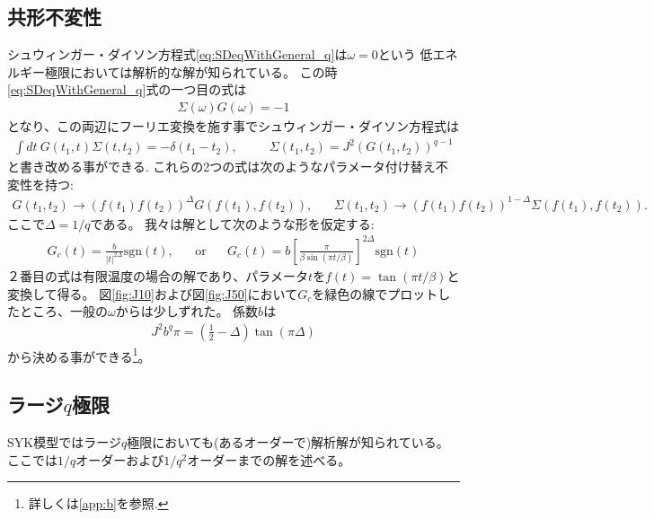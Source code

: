 \subsection{共形不変性}
シュウィンガー・ダイソン方程式\eqref{eq:SDeqWithGeneral_q}は$\omega = 0$という
低エネルギー極限においては解析的な解が知られている。
この時\eqref{eq:SDeqWithGeneral_q}式の一つ目の式は
\begin{align}
	\Sigma(\omega)G(\omega) = -1
\end{align}
となり、この両辺にフーリエ変換を施す事でシュウィンガー・ダイソン方程式は
\begin{align}
	\int dt\ G(t_1, t)\Sigma(t, t_2) = -\delta(t_1 - t_2),
	\hspace{30pt}
	\Sigma(t_1, t_2) = J^2 (G(t_1, t_2))^{q-1}
	\label{eq:conformalSD}
\end{align}
と書き改める事ができる.
これらの2つの式は次のようなパラメータ付け替え不変性を持つ:
\begin{align}
	G(t_1, t_2) \to (f(t_1)f(t_2))^{\Delta}G(f(t_1),f(t_2)),
	\hspace{20pt}
	\Sigma(t_1, t_2) \to (f(t_1)f(t_2))^{1 - \Delta}\Sigma(f(t_1),f(t_2)).
	\label{eq:reparametrization_of_G_and_Sigma}
\end{align}
ここで$\Delta = 1 / q$である。
我々は解として次のような形を仮定する:
\begin{align}
	G_c(t) = \frac{b}{|t|^{2\Delta}}\mathrm{sgn}(t),
	\hspace{20pt}
	\mathrm{or}
	\hspace{20pt}
	G_c(t) = b\left[\frac{\pi}{\beta\sin(\pi t / \beta)}\right]^{2\Delta}\mathrm{sgn}(t)
	\label{eq:conformal_ansatz}
\end{align}
２番目の式は有限温度の場合の解であり、パラメータ$t$を$f(t) = \tan(\pi t / \beta)$と変換して得る。
図\ref{fig:J10}および図\ref{fig:J50}において$G_c$を緑色の線でプロットしたところ、一般の$\omega$からは少しずれた。
係数$b$は
\begin{align}
	J^2 b^q \pi = \left(\frac{1}{2} - \Delta \right)\tan(\pi \Delta)
\end{align}
から決める事ができる\footnote{詳しくは\ref{app:b}を参照.}。

\subsection{ラージ$q$極限}
SYK模型ではラージ$q$極限においても(あるオーダーで)解析解が知られている。
ここでは$1/q$オーダーおよび$1/q^2$オーダーまでの解を述べる。

